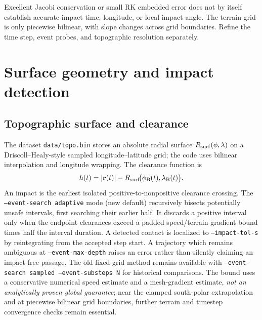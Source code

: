 \documentclass[11pt,a4paper]{article}
\newcommand{\opt}[1]{\texttt{#1}}
\newcommand{\pathcode}[1]{\nolinkurl{#1}}
\begin{document}
\begin{warningbox}[title={Event convergence is separate from state convergence}]
Excellent Jacobi conservation or small RK embedded error does not by itself establish accurate impact time, longitude, or local impact angle. The terrain grid is only piecewise bilinear, with slope changes across grid boundaries. Refine the time step, event probes, and topographic resolution separately.
\end{warningbox}

\section{Surface geometry and impact detection}
\subsection{Topographic surface and clearance}
The dataset \pathcode{data/topo.bin} stores an absolute radial surface \(R_{\rm surf}(\phi,\lambda)\) on a Driscoll--Healy-style sampled longitude--latitude grid; the code uses bilinear interpolation and longitude wrapping. The clearance function is
\begin{equation}
h(t)=|\mathbf r(t)|-R_{\rm surf}\!\big(\phi_{\rm B}(t),\lambda_{\rm B}(t)\big).
\end{equation}
An impact is the earliest isolated positive-to-nonpositive clearance crossing. The
\opt{--event-search adaptive} mode (new default) recursively bisects potentially
unsafe intervals, first searching their earlier half. It discards a positive interval
only when the endpoint clearances exceed a padded speed/terrain-gradient
bound times half the interval duration. A detected contact is localized to
\opt{--impact-tol-s} by reintegrating from the accepted step start. A trajectory
which remains ambiguous at \opt{--event-max-depth} raises an error rather than
silently claiming an impact-free passage. The old fixed-grid method remains
available with \opt{--event-search sampled --event-substeps N} for historical
comparisons. The bound uses a conservative numerical speed estimate and a
mesh-gradient estimate, \emph{not an analytically proven global guarantee};
near the clamped south-polar extrapolation and at piecewise bilinear grid
boundaries, further terrain and timestep convergence checks remain essential.
\end{document}
